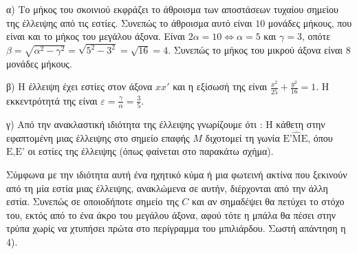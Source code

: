 α) Το μήκος του σκοινιού εκφράζει το άθροισμα των αποστάσεων τυχαίου σημείου της έλλειψης από τις εστίες. Συνεπώς το άθροισμα αυτό είναι $10$ μονάδες μήκους, που είναι και το μήκος του μεγάλου άξονα. Είναι $2\alpha = 10 \Leftrightarrow \alpha = 5$ και $\gamma = 3$, οπότε $\beta = \sqrt{\alpha^2 - \gamma^2} = \sqrt{5^2 - 3^2} = \sqrt{16} = 4$. Συνεπώς το μήκος του μικρού άξονα είναι $8$ μονάδες μήκους.

β) Η έλλειψη έχει εστίες στον άξονα $xx'$ και η εξίσωσή της είναι $\frac{x^2}{25} + \frac{y^2}{16} = 1$.
Η εκκεντρότητά της είναι $\varepsilon = \frac{\gamma}{\alpha} = \frac{3}{5}$.

γ) Από την ανακλαστική ιδιότητα της έλλειψης γνωρίζουμε ότι : Η κάθετη στην εφαπτομένη μιας έλλειψης στο σημείο επαφής $M$ διχοτομεί τη γωνία $\text{E'}\hat{\text{M}}\text{E}$, όπου $\text{E,E'}$ οι εστίες της έλλειψης (όπως φαίνεται στο παρακάτω σχήμα).


Σύμφωνα με την ιδιότητα αυτή ένα ηχητικό κύμα ή μια φωτεινή ακτίνα που ξεκινούν από τη μία εστία μιας έλλειψης, ανακλώμενα σε αυτήν, διέρχονται από την άλλη εστία. Συνεπώς σε οποιοδήποτε σημείο της $C$ και αν σημαδέψει θα πετύχει το στόχο του, εκτός από το ένα άκρο του μεγάλου άξονα, αφού τότε η μπάλα θα πέσει στην τρύπα χωρίς να χτυπήσει πρώτα στο περίγραμμα του μπιλιάρδου.
Σωστή απάντηση η 4).

